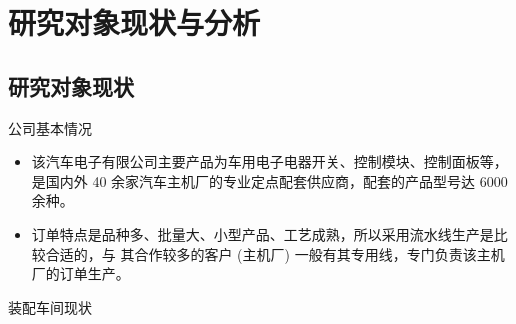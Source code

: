 \documentclass{beamer}
\begin{document}
\section{研究对象现状与分析}
\subsection{研究对象现状}
\begin{frame}{公司基本情况}
\begin{itemize}[<+-| alert@+>]
\item 该汽车电子有限公司主要产品为车用电子电器开关、控制模块、控制面板等，是国内外 40 余家汽车主机厂的专业定点配套供应商，配套的产品型号达 6000 余种。
\item 订单特点是品种多、批量大、小型产品、工艺成熟，所以采用流水线生产是比较合适的，与
其合作较多的客户 (主机厂) 一般有其专用线，专门负责该主机厂的订单生产。
\end{itemize}
\end{frame}
\begin{frame}{装配车间现状}
\end{frame}
\end{document}
